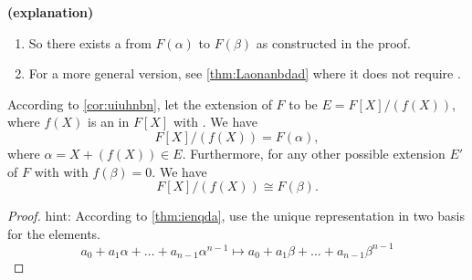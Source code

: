 \documentclass{article}
\newcommand{\bfs}[1]{\textbf{({#1}) }}
\begin{document}
\begin{rema}\bfs{explanation}
\begin{enumerate}
    \item So there exists a  from $F(\alpha)$ to $F(\beta)$ as constructed in the proof.
    \item For a more general version, see \cref{thm:Laonanbdad} where it does not require .
\end{enumerate}

\end{rema}

\begin{corx}\label{cor:ionadere}
   According to \cref{cor:uiuhnbn}, let the extension of $F$ to be $E=F[X]/(f(X))$, where $f(X)$ is an  in $F[X]$ with . We have $$F[X]/(f(X))=F(\alpha),$$
where $\alpha = X+(f(X))\in E$.
Furthermore, for any other possible extension $E'$ of $F$ with with $f(\beta)=0$. We have 
 $$F[X]/(f(X))\cong F(\beta).$$
\end{corx}
\begin{proof}
hint: According to \cref{thm:ienqda}, use the unique representation in two basis for the elements.
$$
a_{0}+a_{1} \alpha+\ldots+a_{n-1} \alpha^{n-1} \mapsto a_{0}+a_{1} \beta+\ldots+a_{n-1} \beta^{n-1}
$$
\end{proof}
\end{document}

